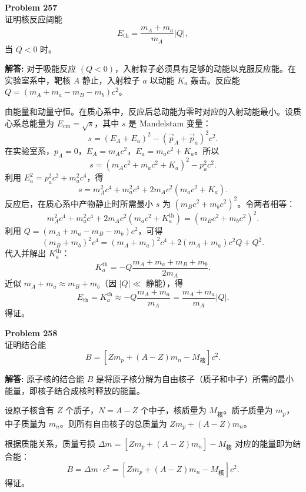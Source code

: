 \documentclass[12pt, a4paper, oneside]{ctexart}
\newenvironment{solution}{\par\noindent\textbf{解答:}\quad}{\par}
\begin{document}
\begin{mdframed}[backgroundcolor=gray!10, linewidth=0pt]
    \textbf{Problem 257} \\
    证明核反应阈能
    \[
    E_{\text{th}} = \frac{m_A + m_a}{m_A} |Q|,
    \]
    当 $Q<0$ 时。
\end{mdframed}
\begin{solution}
    对于吸能反应 $(Q<0)$，入射粒子必须具有足够的动能以克服反应能。在实验室系中，靶核 $A$ 静止，入射粒子 $a$ 以动能 $K_a$ 轰击。反应能 $Q = (m_A + m_a - m_B - m_b)c^2$。

    由能量和动量守恒。在质心系中，反应后总动能为零时对应的入射动能最小。设质心系总能量为 $E_{\text{cm}} = \sqrt{s}$，其中 $s$ 是 Mandelstam 变量：
    \[
    s = (E_A + E_a)^2 - (\vec{p}_A + \vec{p}_a)^2 c^2.
    \]
    在实验室系，$p_A=0$，$E_A = m_A c^2$，$E_a = m_a c^2 + K_a$。所以
    \[
    s = (m_A c^2 + m_a c^2 + K_a)^2 - p_a^2 c^2.
    \]
    利用 $E_a^2 = p_a^2 c^2 + m_a^2 c^4$，得
    \[
    s = m_A^2 c^4 + m_a^2 c^4 + 2 m_A c^2 (m_a c^2 + K_a).
    \]
    反应后，在质心系中产物静止时所需最小 $s$ 为 $(m_B c^2 + m_b c^2)^2$。令两者相等：
    \[
    m_A^2 c^4 + m_a^2 c^4 + 2 m_A c^2 (m_a c^2 + K_a^{\text{th}}) = (m_B c^2 + m_b c^2)^2.
    \]
    利用 $Q = (m_A + m_a - m_B - m_b)c^2$，可得
    \[
    (m_B + m_b)^2 c^4 = (m_A + m_a)^2 c^4 + 2(m_A+m_a)c^2 Q + Q^2.
    \]
    代入并解出 $K_a^{\text{th}}$：
    \[
    K_a^{\text{th}} = -Q \frac{m_A + m_a + m_B + m_b}{2m_A}.
    \]
    近似 $m_A + m_a \approx m_B + m_b$（因 $|Q| \ll$ 静能），得
    \[
    E_{\text{th}} = K_a^{\text{th}} \approx -Q \frac{m_A + m_a}{m_A} = \frac{m_A + m_a}{m_A} |Q|.
    \]
    得证。
\end{solution}

\begin{mdframed}[backgroundcolor=gray!10, linewidth=0pt]
    \textbf{Problem 258} \\
    证明结合能
    \[
    B = [Z m_p + (A-Z) m_n - M_{\text{核}}] c^2.
    \]
\end{mdframed}
\begin{solution}
    原子核的结合能 $B$ 是将原子核分解为自由核子（质子和中子）所需的最小能量，即核子结合成核时释放的能量。

    设原子核含有 $Z$ 个质子，$N = A-Z$ 个中子，核质量为 $M_{\text{核}}$。质子质量为 $m_p$，中子质量为 $m_n$。则所有自由核子的总质量为 $Z m_p + (A-Z) m_n$。

    根据质能关系，质量亏损 $\Delta m = [Z m_p + (A-Z) m_n] - M_{\text{核}}$ 对应的能量即为结合能：
    \[
    B = \Delta m \cdot c^2 = [Z m_p + (A-Z) m_n - M_{\text{核}}] c^2.
    \]
    得证。
\end{solution}
\end{document}
